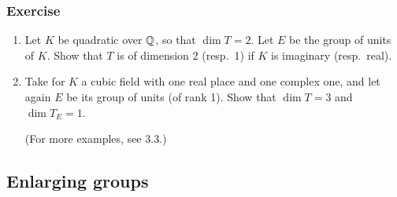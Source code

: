 \subsubsection*{Exercise}
\begin{enumerate}[label=\textit{\alph*}.]
\item Let $K$ be quadratic over $\mathbb{Q}$, so that $\dim T = 2$. Let $E$ be the
	group of units of $K$. Show that $T$ is of dimension 2 (resp.\ 1) if
	$K$ is imaginary (resp.\ real).
\item Take for $K$ a cubic field with one real place and one complex one, and
	let again $E$ be its group of units (of rank 1). Show that $\dim T = 3$
	and $\dim T_E = 1$.

	(For more examples, see 3.3.)\dpage
\end{enumerate}

\subsection{Enlarging groups}
\label{sec:II_13}

